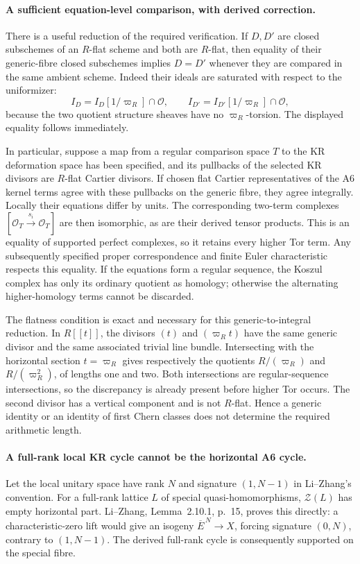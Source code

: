 \documentclass[11pt]{article}
\theoremstyle{definition}\newtheorem{definition}[theorem]{Definition}\newtheorem{remark}[theorem]{Remark}
\begin{document}
\paragraph{A sufficient equation-level comparison, with derived correction.}
There is a useful reduction of the required verification.
If $D,D'$ are closed subschemes of an $R$-flat scheme and
both are $R$-flat, then equality of their generic-fibre
closed subschemes implies $D=D'$ whenever they are compared
in the same ambient scheme.  Indeed their ideals are saturated
with respect to the uniformizer:
\[
 I_D=I_D[1/\varpi_R]\cap\mathcal O,
       \qquad
 I_{D'}=I_{D'}[1/\varpi_R]\cap\mathcal O,
\]
because the two quotient structure sheaves have no
$\varpi_R$-torsion.  The displayed equality follows immediately.

In particular, suppose a map from a regular comparison space
$T$ to the KR deformation space has been specified, and its
pullbacks of the selected KR divisors are $R$-flat Cartier
divisors.  If chosen flat Cartier representatives of the A6
kernel terms agree with these pullbacks on the generic fibre,
they agree integrally.  Locally their equations differ by units.
The corresponding two-term complexes
$[\mathcal O_T\xrightarrow{s_i}\mathcal O_T]$ are then
isomorphic, as are their derived tensor products.
This is an equality of supported perfect complexes, so it
retains every higher Tor term.
Any subsequently specified proper correspondence and finite
Euler characteristic respects this equality.
If the equations form a regular sequence, the Koszul
complex has only its ordinary quotient as homology; otherwise
the alternating higher-homology terms cannot be discarded.

The flatness condition is exact and necessary for this
generic-to-integral reduction.  In $R[[t]]$, the divisors
$(t)$ and $(\varpi_Rt)$ have the same generic divisor and
the same associated trivial line bundle.
Intersecting with the horizontal section $t=\varpi_R$
gives respectively the quotients $R/(\varpi_R)$ and
$R/(\varpi_R^2)$, of lengths one and two.
Both intersections are regular-sequence intersections, so
the discrepancy is already present before higher Tor occurs.
The second divisor has a vertical component and is not
$R$-flat.  Hence a generic identity or an identity of first
Chern classes does not determine the required arithmetic length.

\paragraph{A full-rank local KR cycle cannot be the horizontal A6 cycle.}
Let the local unitary space have rank $N$ and signature
$(1,N-1)$ in Li--Zhang's convention.
For a full-rank lattice $L$ of special quasi-homomorphisms,
$\mathcal Z(L)$ has empty horizontal part.
Li--Zhang, Lemma~2.10.1, p.~15, proves this directly:
a characteristic-zero lift would give an isogeny
$\overline E^{\,N}\to X$, forcing signature $(0,N)$,
contrary to $(1,N-1)$.
The derived full-rank cycle is consequently supported on
the special fibre.
\end{document}

